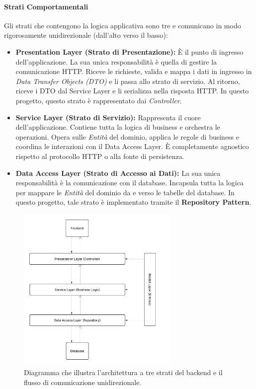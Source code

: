 \documentclass[12pt,a4paper,openright,twoside]{book}
\begin{document}
\paragraph{Strati Comportamentali}
Gli strati che contengono la logica applicativa sono tre e comunicano in modo rigorosamente unidirezionale (dall'alto verso il basso):

\begin{itemize}
    \item \textbf{Presentation Layer (Strato di Presentazione):} È il punto di ingresso dell'applicazione. La sua unica responsabilità è quella di gestire la comunicazione HTTP. Riceve le richieste, valida e mappa i dati in ingresso in \textit{Data Transfer Objects (DTO)} e li passa allo strato di servizio. Al ritorno, riceve i DTO dal Service Layer e li serializza nella risposta HTTP. In questo progetto, questo strato è rappresentato dai \textit{Controller}.

    \item \textbf{Service Layer (Strato di Servizio):} Rappresenta il cuore dell'applicazione. Contiene tutta la logica di business e orchestra le operazioni. Opera sulle \textit{Entità} del dominio, applica le regole di business e coordina le interazioni con il Data Access Layer. È completamente agnostico rispetto al protocollo HTTP o alla fonte di persistenza.

    \item \textbf{Data Access Layer (Strato di Accesso ai Dati):} La sua unica responsabilità è la comunicazione con il database. Incapsula tutta la logica per mappare le \textit{Entità} del dominio da e verso le tabelle del database. In questo progetto, tale strato è implementato tramite il \textbf{Repository Pattern}.
\end{itemize}

\begin{figure}[htbp]
    \centering
    \includegraphics[width=0.7\textwidth]{figures/layer_design.pdf}
    \caption{Diagramma che illustra l'architettura a tre strati del backend e il flusso di comunicazione unidirezionale.}
    \label{fig:layered_architecture_uml}
\end{figure}
\end{document}
